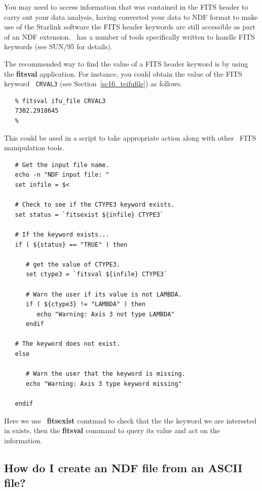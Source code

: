 \documentclass[twoside,11pt]{article}
\newcommand{\htmlref}[2]{#1}
\newcommand{\xref}[3]{#1}
\newcommand{\xlabel}[1]{}
\newcommand{\latex}[1]{#1}
\begin{document}
{You may need to access information that was contained in the FITS
header to carry out your data analysis, having converted your data to
\xref{NDF}{sun33}{} format to make use of the Starlink software the
FITS header keywords are still accessible as part of an NDF extension.
\KAPPAref\ has a number of tools specifically written to handle
\xref{FITS keywords}{sun95}{se_fitsairlock}\latex{ (see SUN/95 for
details)}.

The recommended way to find the value of a FITS header keyword is by
using the \xref{{\bf fitsval}}{sun95}{FITSVAL} application.  For instance, you
could obtain the value of the FITS keyword \htmlref{{\tt
CRVAL3}}{sc16_teifufile}\latex{ (see
Section~\ref{sc16_teifufile})} as follows.

\small\begin{verbatim}
   % fitsval ifu_file CRVAL3
   7302.2918645
   %
\end{verbatim}\normalsize

This could be used in a script to take appropriate action along with
other \KAPPA\ \xref{FITS manipulation tools}{sun95}{se_fitsairlock}.

\small\begin{verbatim}
   # Get the input file name.
   echo -n "NDF input file: "
   set infile = $<
   
   # Check to see if the CTYPE3 keyword exists.
   set status = `fitsexist ${infile} CTYPE3`
   
   # If the keyword exists...
   if ( ${status} == "TRUE" ) then
   
      # get the value of CTYPE3.
      set ctype3 = `fitsval ${infile} CTYPE3`

      # Warn the user if its value is not LAMBDA.
      if ( ${ctype3} != "LAMBDA" ) then
         echo "Warning: Axis 3 not type LAMBDA"
      endif
      
   # The keyword does not exist.
   else
   
      # Warn the user that the keyword is missing.
      echo "Warning: Axis 3 type keyword missing"
      
   endif
\end{verbatim}\normalsize

Here we use \KAPPA\ \xref{{\bf fitsexist}}{sun95}{FITSEXIST} comtmnd to check
that the the keyword we are interested in exists, then the
{\bf fitsval} command to query its value and act on
the information.

\subsection{\xlabel{sc16_newndf}How do I create an NDF file from an ASCII file?\label{sc16_newndf}}

}
\end{document}
